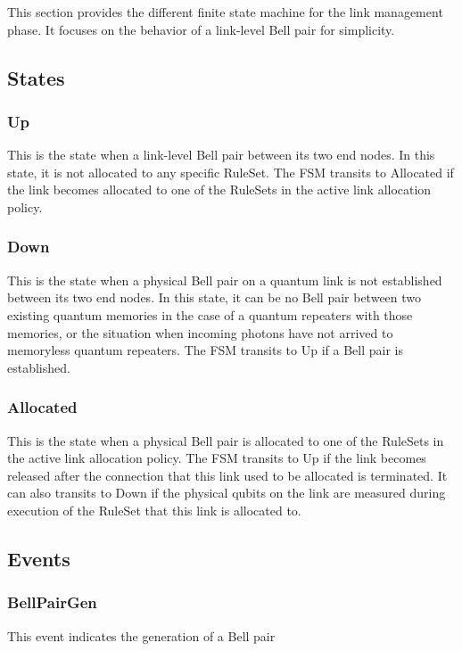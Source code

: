 This section provides the different finite state machine for the link management phase. It focuses on the behavior of a link-level Bell pair for simplicity.

\subsection{States}

\subsubsection{Up}
This is the state when a link-level Bell pair between its two end nodes. In this state, it is not allocated to any specific RuleSet.
The FSM transits to Allocated if the link becomes allocated to one of the RuleSets in the active link allocation policy.

\subsubsection{Down}
This is the state when a physical Bell pair on a quantum link is not established between its two end nodes. In this state, it can be no Bell pair between two existing quantum memories in the case of a quantum repeaters with those memories, or the situation when incoming photons have not arrived to memoryless quantum repeaters.
The FSM transits to Up if a Bell pair is established.

\subsubsection{Allocated}
This is the state when a physical Bell pair is allocated to one of the RuleSets in the active link allocation policy.
The FSM transits to Up if the link becomes released after the connection that this link used to be allocated is terminated.
It can also transits to Down if the physical qubits on the link are measured during execution of the RuleSet that this link is allocated to.

\subsection{Events}

\subsubsection{BellPairGen}
This event indicates the generation of a Bell pair


